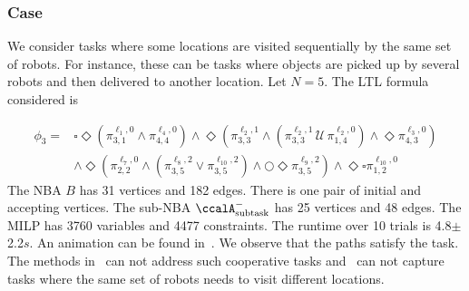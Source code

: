 \documentclass[Afour,sageh,times]{sagej}
\newcommand{\auto}[1]{\ccalA_{\textup{#1}}}
\newcommand{\aap}[4]{\mathcal{\pi}_{{#1},{#2}}^{#3,#4}}
\newcommand{\RNum}[1]{\uppercase\expandafter{\romannumeral #1\relax}}
\begin{document}
{%

\subsubsection{Case \RNum{2}} We consider tasks where some locations are visited sequentially by the same set of robots. For instance, these can be tasks where objects are  picked up by several robots and then delivered to another location.
Let $N=5$. The LTL formula  considered is

\small
\begingroup
\begin{align*}
  \phi_3 = &  \square \Diamond (\pi^{\ell_1,0}_{3,1} \wedge \pi^{\ell_4, 0}_{4,4}) \wedge \Diamond ( \pi^{\ell_2,1}_{3,3} \wedge  (\pi^{\ell_2,1}_{3,3} \,\mathcal{U} \, \pi^{\ell_2,0}_{1,4})  \wedge \Diamond \pi_{4,3}^{\ell_3,0})   \nonumber \\ & \wedge \Diamond (\aap{2}{2}{\ell_7}{0} \wedge (\aap{3}{5}{\ell_8}{2} \vee \aap{3}{5}{\ell_{10}}{2}) \wedge \bigcirc  \Diamond  \aap{3}{5}{\ell_{9}}{2} ) \wedge \Diamond \square \aap{1}{2}{\ell_{10}}{0}
\end{align*}
\endgroup
\normalsize
The NBA $B$ has 31 vertices and 182 edges. There is one pair of initial and accepting vertices. The sub-NBA $\auto{subtask}^-$ has 25 vertices and 48 edges. The MILP has 3760 variables and 4477 constraints. The runtime over 10 trials is 4.8$\pm$2.2$s$. {An animation can be found in~\cite{ltlmrta}.} We observe that the paths satisfy the task. The methods in~\cite{schillinger2018decomposition,schillinger2018simultaneous,faruq2018simultaneous} can not address such cooperative tasks and~\cite{sahin2017provably,sahin2017synchronous,sahin2019multi,sahin2019multirobot} can not capture tasks where the same set of robots needs to visit different locations.


}
\end{document}
